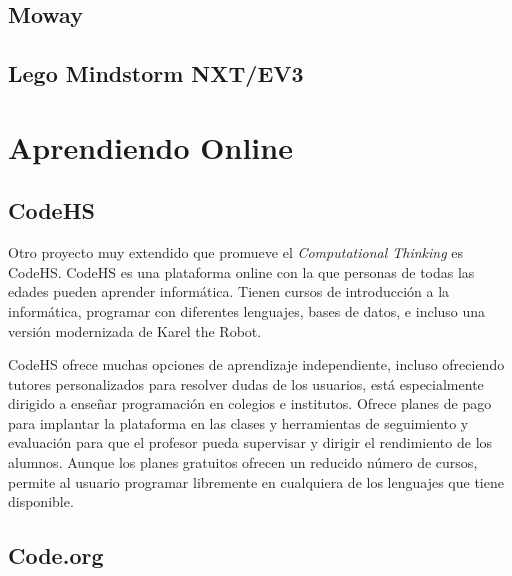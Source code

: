 \subsection{Moway}
\label{sec:moway}




\subsection{Lego Mindstorm NXT/EV3}
\label{sec:lego-nxt-ec3}





\section{Aprendiendo Online}
\label{sec:aprendiendo-online}

\subsection{CodeHS}
\label{sec:CodeHS}


Otro proyecto muy extendido que promueve el \emph{Computational Thinking} es CodeHS. CodeHS es una plataforma online con la que personas de todas las edades pueden aprender informática. Tienen cursos de introducción a la informática, programar con diferentes lenguajes, bases de datos, e incluso una versión modernizada de Karel the Robot\cite{pattis1981karel}. 

CodeHS ofrece muchas opciones de aprendizaje independiente, incluso ofreciendo tutores personalizados para resolver dudas de los usuarios, está especialmente dirigido a enseñar programación en colegios e institutos. Ofrece planes de pago para implantar la plataforma en las clases y herramientas de seguimiento y evaluación para que el profesor pueda supervisar y dirigir el rendimiento de los alumnos. Aunque los planes gratuitos ofrecen un reducido número de cursos, permite al usuario programar libremente en cualquiera de los lenguajes que tiene disponible. 



\subsection{Code.org}
\label{sec:Code.org}






